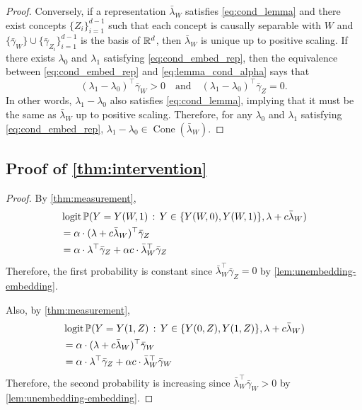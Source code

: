 \documentclass{article}
\theoremstyle{plain}
\theoremstyle{definition}
\theoremstyle{remark}
\DeclareMathOperator{\ConeOp}{Cone}
\newcommand{\Cone}[1]{\ConeOp(#1)}
\begin{document}
\begin{proof}
    Conversely, if a representation $\bar\lambda_W$ satisfies \eqref{eq:cond_lemma} and there exist concepts $\{Z_i\}_{i=1}^{d-1}$ such that each concept is causally separable with $W$ and $\{\bar\gamma_W\}\cup\{\bar\gamma_{Z_i}\}_{i=1}^{d-1}$ is the basis of $\mathbb{R}^d$, then $\bar\lambda_W$ is unique up to positive scaling. If there exists $\lambda_0$ and $\lambda_1$ satisfying \eqref{eq:cond_embed_rep}, then the equivalence between \eqref{eq:cond_embed_rep} and \eqref{eq:lemma_cond_alpha} says that
    \begin{equation}
        (\lambda_1 - \lambda_0)^\top \bar\gamma_W > 0 \quad \text{and}\quad (\lambda_1 - \lambda_0)^\top \bar\gamma_Z = 0.
    \end{equation}
    In other words, $\lambda_1 - \lambda_0$ also satisfies \eqref{eq:cond_lemma}, implying that it must be the same as $\bar\lambda_W$ up to positive scaling.
    Therefore, for any $\lambda_0$ and $\lambda_1$ satisfying \eqref{eq:cond_embed_rep}, $\lambda_1 - \lambda_0 \in \Cone{\bar{\lambda}_W}$.
\end{proof}


\subsection{Proof of \cref{thm:intervention}}
\intervention*
\begin{proof}
    By \cref{thm:measurement},
    \begin{align}
        &\logit\Pr(Y= Y(W,1) \given Y\in\{Y(W,0), Y(W,1)\}, \lambda + c\bar\lambda_W)\\
        &= \alpha \cdot (\lambda+c\bar\lambda_W)^\top \bar\gamma_Z\\
        &=\alpha \cdot \lambda^\top \bar\gamma_Z + \alpha c \cdot \bar\lambda_W^\top \bar\gamma_Z
    \end{align}
    Therefore, the first probability is constant since $\bar\lambda_W^\top \bar\gamma_Z =0$ by \cref{lem:unembedding-embedding}.
    
    Also, by \cref{thm:measurement},
    \begin{align}
        &\logit\Pr(Y = Y(1,Z) \given Y\in\{Y(0,Z), Y(1,Z)\}, \lambda + c\bar\lambda_W)\\
        &= \alpha \cdot (\lambda+c\bar\lambda_W)^\top \bar\gamma_W\\
        &=\alpha \cdot \lambda^\top \bar\gamma_Z + \alpha c \cdot \bar\lambda_W^\top \bar\gamma_W
    \end{align}
    Therefore, the second probability is increasing since $\bar\lambda_W^\top \bar\gamma_W >0$ by \cref{lem:unembedding-embedding}.
\end{proof}
\end{document}
